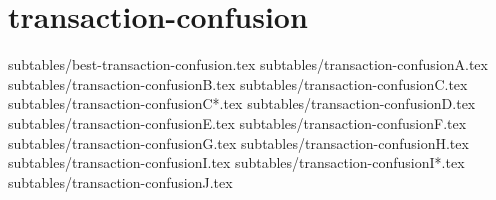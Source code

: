 \section{transaction-confusion}
    {subtables/best-transaction-confusion.tex}
    {subtables/transaction-confusionA.tex}
    {subtables/transaction-confusionB.tex}
    {subtables/transaction-confusionC.tex}
    {subtables/transaction-confusionC*.tex}
    {subtables/transaction-confusionD.tex}
    {subtables/transaction-confusionE.tex}
    {subtables/transaction-confusionF.tex}
    {subtables/transaction-confusionG.tex}
    {subtables/transaction-confusionH.tex}
    {subtables/transaction-confusionI.tex}
    {subtables/transaction-confusionI*.tex}
    {subtables/transaction-confusionJ.tex}
\newpage